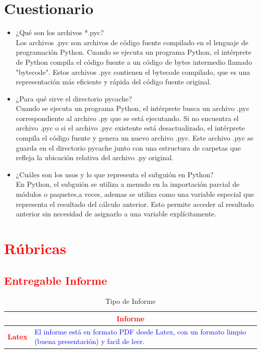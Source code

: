 \documentclass{article}
\begin{document}
\begin{itemize}
\section{Cuestionario}
	\begin{itemize}
		\item ¿Qué son los archivos *.pyc?
        \\ Los archivos .pyc son archivos de código fuente compilado en el lenguaje de programación Python. Cuando se ejecuta un programa Python, el intérprete de Python compila el código fuente a un código de bytes intermedio llamado "bytecode". Estos archivos .pyc contienen el bytecode compilado, que es una representación más eficiente y rápida del código fuente original.
        \item ¿Para qué sirve el directorio pycache?
        \\ Cuando se ejecuta un programa Python, el intérprete busca un archivo .pyc correspondiente al archivo .py que se está ejecutando. Si no encuentra el archivo .pyc o si el archivo .pyc existente está desactualizado, el intérprete compila el código fuente y genera un nuevo archivo .pyc. Este archivo .pyc se guarda en el directorio pycache junto con una estructura de carpetas que refleja la ubicación relativa del archivo .py original.
        \item ¿Cuáles son los usos y lo que representa el subguión en Python?
        \\En Python, el subguión se utiliza a menudo en la importación parcial de módulos o paquetes,a veces, ademas se utiliza como una variable especial que representa el resultado del cálculo anterior. Esto permite acceder al resultado anterior sin necesidad de asignarlo a una variable explícitamente.
        
	\end{itemize}		

	\section{\textcolor{red}{Rúbricas}}
	
	\subsection{\textcolor{red}{Entregable Informe}}
	\begin{table}[H]
		\caption{Tipo de Informe}
		\setlength{\tabcolsep}{0.5em} %
		{\renewcommand{\arraystretch}{1.5}%
		\begin{tabular}{|p{3cm}|p{12cm}|}
			\hline
			\multicolumn{2}{|c|}{\textbf{\textcolor{red}{Informe}}}  \\
			\hline 
			\textbf{\textcolor{red}{Latex}} & \textcolor{blue}{El informe está en formato PDF desde Latex,  con un formato limpio (buena presentación) y facil de leer.}   \\ 
			\hline 
			

\end{tabular}}
\end{table}
\end{itemize}
\end{document}
